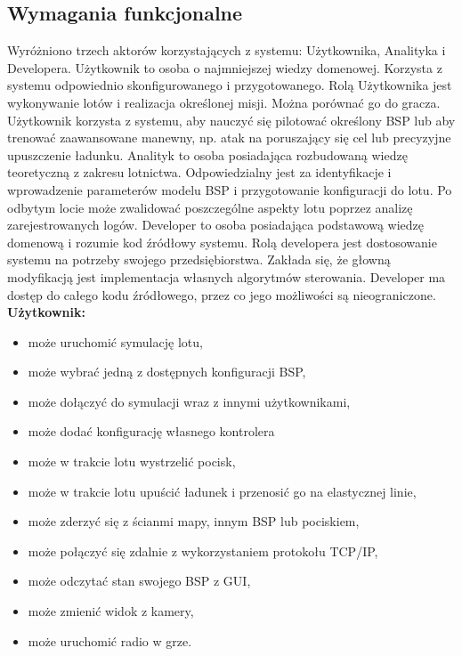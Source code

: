 \documentclass[15pt]{sprawozdanie}
\begin{document}
\newpage
\subsection{Wymagania funkcjonalne}

Wyróżniono trzech aktorów korzystających z systemu: Użytkownika, Analityka i Developera. Użytkownik to osoba o najmniejszej wiedzy domenowej. Korzysta z systemu odpowiednio skonfigurowanego i przygotowanego. Rolą Użytkownika jest wykonywanie lotów i realizacja określonej misji. Można porównać go do gracza. Użytkownik korzysta z systemu, aby nauczyć się pilotować określony BSP lub aby trenować zaawansowane manewny, np. atak na poruszający się cel lub precyzyjne upuszczenie ładunku. Analityk to osoba posiadająca rozbudowaną wiedzę teoretyczną z zakresu lotnictwa. Odpowiedzialny jest za identyfikacje i wprowadzenie parameterów modelu BSP i przygotowanie konfiguracji do lotu. Po odbytym locie może zwalidować poszczególne aspekty lotu poprzez analizę zarejestrowanych logów. Developer to osoba posiadająca podstawową wiedzę domenową i rozumie kod źródłowy systemu. Rolą developera jest dostosowanie systemu na potrzeby swojego przedsiębiorstwa. Zakłada się, że głowną modyfikacją jest implementacja własnych algorytmów sterowania. Developer ma dostęp do całego kodu źródłowego, przez co jego możliwości są nieograniczone.\\

\textbf{Użytkownik:}
\begin{itemize}[noitemsep,nolistsep]
	\item może uruchomić symulację lotu,
	\item może wybrać jedną z dostępnych konfiguracji BSP,
	\item może dołączyć do symulacji wraz z innymi użytkownikami,
	\item może dodać konfigurację własnego kontrolera
	\item może w trakcie lotu wystrzelić pocisk,
	\item może w trakcie lotu upuścić ładunek i przenosić go na elastycznej linie,
	\item może zderzyć się z ścianmi mapy, innym BSP lub pociskiem,
	\item może połączyć się zdalnie z wykorzystaniem protokołu TCP/IP,
	\item może odczytać stan swojego BSP z GUI,
	\item może zmienić widok z kamery,
	\item może uruchomić radio w grze.
\end{itemize}
\ \\
\end{document}

